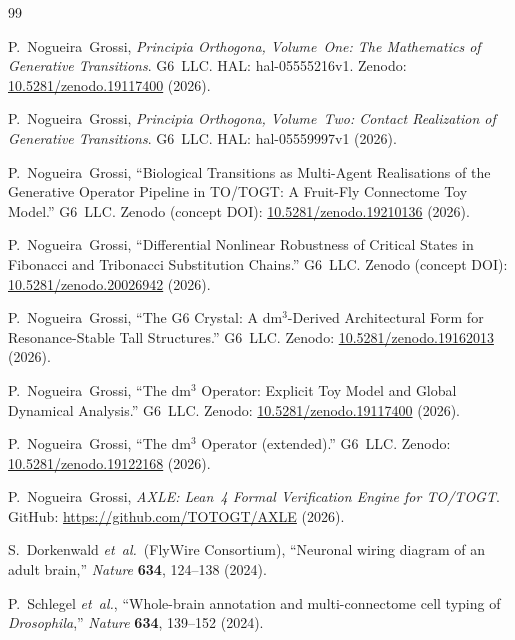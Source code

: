 \documentclass[12pt,a4paper]{article}
\begin{document}
\begin{thebibliography}{99}

P.~Nogueira~Grossi,
\textit{Principia Orthogona, Volume~One: The Mathematics of Generative
Transitions}.
G6~LLC. HAL: hal-05555216v1. Zenodo:
\href{https://doi.org/10.5281/zenodo.19117400}{10.5281/zenodo.19117400}
(2026).

P.~Nogueira~Grossi,
\textit{Principia Orthogona, Volume~Two: Contact Realization of
Generative Transitions}.
G6~LLC. HAL: hal-05559997v1 (2026).

P.~Nogueira~Grossi,
``Biological Transitions as Multi-Agent Realisations of the Generative
Operator Pipeline in TO/TOGT: A Fruit-Fly Connectome Toy Model.''
G6~LLC. Zenodo (concept DOI):
\href{https://doi.org/10.5281/zenodo.19210136}{10.5281/zenodo.19210136}
(2026).

P.~Nogueira~Grossi,
``Differential Nonlinear Robustness of Critical States in Fibonacci and
Tribonacci Substitution Chains.''
G6~LLC. Zenodo (concept DOI):
\href{https://doi.org/10.5281/zenodo.20026942}{10.5281/zenodo.20026942}
(2026).

P.~Nogueira~Grossi,
``The G6 Crystal: A dm$^3$-Derived Architectural Form for
Resonance-Stable Tall Structures.''
G6~LLC. Zenodo:
\href{https://doi.org/10.5281/zenodo.19162013}{10.5281/zenodo.19162013}
(2026).

P.~Nogueira~Grossi,
``The dm$^3$ Operator: Explicit Toy Model and Global Dynamical
Analysis.''
G6~LLC. Zenodo:
\href{https://doi.org/10.5281/zenodo.19117400}{10.5281/zenodo.19117400}
(2026).

P.~Nogueira~Grossi,
``The dm$^3$ Operator (extended).''
G6~LLC. Zenodo:
\href{https://doi.org/10.5281/zenodo.19122168}{10.5281/zenodo.19122168}
(2026).

P.~Nogueira~Grossi,
\textit{AXLE: Lean~4 Formal Verification Engine for TO/TOGT}.
GitHub: \url{https://github.com/TOTOGT/AXLE} (2026).

S.~Dorkenwald \textit{et~al.}\ (FlyWire Consortium),
``Neuronal wiring diagram of an adult brain,''
\textit{Nature} \textbf{634}, 124--138 (2024).

P.~Schlegel \textit{et~al.},
``Whole-brain annotation and multi-connectome cell typing of
\textit{Drosophila},''
\textit{Nature} \textbf{634}, 139--152 (2024).


\end{thebibliography}
\end{document}
